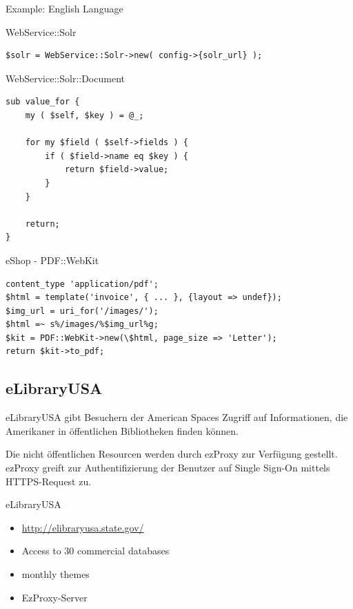 Example: English Language

\begin{frame}[fragile]{WebService::Solr}
\begin{lstlisting}
$solr = WebService::Solr->new( config->{solr_url} );
\end{lstlisting}
\end{frame}

\begin{frame}[fragile]{WebService::Solr::Document}
\begin{lstlisting}
sub value_for {
    my ( $self, $key ) = @_;
 
    for my $field ( $self->fields ) {
        if ( $field->name eq $key ) {
            return $field->value;
        }
    }
 
    return;
}
\end{lstlisting}
\end{frame}

\begin{frame}[fragile]{eShop - PDF::WebKit}
\begin{lstlisting}
content_type 'application/pdf';
$html = template('invoice', { ... }, {layout => undef});
$img_url = uri_for('/images/');
$html =~ s%/images/%$img_url%g;
$kit = PDF::WebKit->new(\$html, page_size => 'Letter');
return $kit->to_pdf;
\end{lstlisting}
\end{frame}

\subsection{eLibraryUSA}

eLibraryUSA gibt Besuchern der American Spaces Zugriff
auf Informationen, die Amerikaner in öffentlichen
Bibliotheken finden können.
    
Die nicht öffentlichen Resourcen werden durch ezProxy zur
Verfügung gestellt. ezProxy greift zur Authentifizierung
der Benutzer auf Single Sign-On mittels HTTPS-Request zu.

\begin{frame}{eLibraryUSA}
\begin{itemize}
\item \url{http://elibraryusa.state.gov/}
\item Access to 30 commercial databases
\item monthly themes
\item EzProxy-Server
\end{itemize}
\end{frame}

